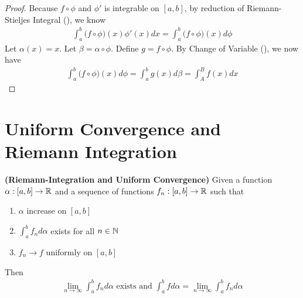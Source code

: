 \documentclass{report}
\begin{document}
\begin{proof}
Because $f\circ \phi$ and  $\phi'$ is integrable on $[a,b]$, by reduction of Riemann-Stieljes Integral (), we know 
\begin{align*}
\int_a^b \big(f\circ \phi)(x)  \phi'(x)dx= \int_a^b \big(f\circ \phi \big)(x)d \phi
\end{align*}
Let $\alpha (x)=x$. Let $\beta = \alpha \circ  \phi$. Define $g=f \circ  \phi $. By Change of Variable (), we now have  
\begin{align*}
\int_a^b \big(f \circ  \phi \big)(x)d \phi =\int_a^b g(x)d\beta = \int_A^B f(x)dx
\end{align*}
\end{proof}
\section{Uniform Convergence and Riemann Integration}
\begin{theorem}
\label{RIFac}
\textbf{(Riemann-Integration and Uniform Convergence)} Given a function $\alpha :[a,b]\rightarrow \mathbb{R}$ and a sequence of functions $f_n:[a,b]\rightarrow \mathbb{R}$ such that 
\begin{enumerate}[label=(\alph*)]
  \item $\alpha $ increase on $[a,b]$ 
  \item $\int_a^b f_nd\alpha $ exists for all $n\in\mathbb{N}$ 
  \item $f_n \to f $ uniformly on $[a,b]$ 
\end{enumerate}
Then 
\begin{align*}
  \lim_{n\to \infty}\int_a^b f_n d\alpha \text{ exists and }\int_a^b fd\alpha =\lim_{n\to \infty}\int_a^b f_nd\alpha 
\end{align*}
\end{theorem}
\end{document}
